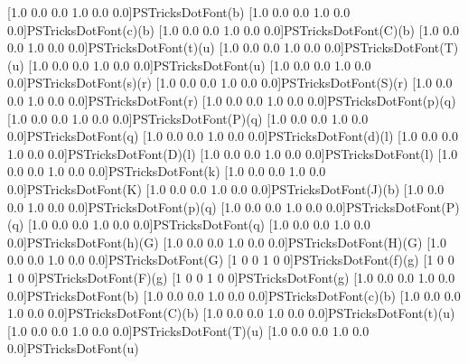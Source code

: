 \newpsfontdot{*}[1.0 0.0 0.0 1.0 0.0 0.0]{PSTricksDotFont}{(b)}
[1.0 0.0 0.0 1.0 0.0 0.0]{PSTricksDotFont}{(c)}{(b)}
[1.0 0.0 0.0 1.0 0.0 0.0]{PSTricksDotFont}{(C)}{(b)}
[1.0 0.0 0.0 1.0 0.0 0.0]{PSTricksDotFont}{(t)}{(u)}
[1.0 0.0 0.0 1.0 0.0 0.0]{PSTricksDotFont}{(T)}{(u)}
[1.0 0.0 0.0 1.0 0.0 0.0]{PSTricksDotFont}{(u)}
[1.0 0.0 0.0 1.0 0.0 0.0]{PSTricksDotFont}{(s)}{(r)}
[1.0 0.0 0.0 1.0 0.0 0.0]{PSTricksDotFont}{(S)}{(r)}
[1.0 0.0 0.0 1.0 0.0 0.0]{PSTricksDotFont}{(r)}
[1.0 0.0 0.0 1.0 0.0 0.0]{PSTricksDotFont}{(p)}{(q)}
[1.0 0.0 0.0 1.0 0.0 0.0]{PSTricksDotFont}{(P)}{(q)}
[1.0 0.0 0.0 1.0 0.0 0.0]{PSTricksDotFont}{(q)}
[1.0 0.0 0.0 1.0 0.0 0.0]{PSTricksDotFont}{(d)}{(l)}
[1.0 0.0 0.0 1.0 0.0 0.0]{PSTricksDotFont}{(D)}{(l)}
[1.0 0.0 0.0 1.0 0.0 0.0]{PSTricksDotFont}{(l)}
[1.0 0.0 0.0 1.0 0.0 0.0]{PSTricksDotFont}{(k)}
[1.0 0.0 0.0 1.0 0.0 0.0]{PSTricksDotFont}{(K)}
[1.0 0.0 0.0 1.0 0.0 0.0]{PSTricksDotFont}{(J)}{(b)}
%
[1.0 0.0 0.0 1.0 0.0 0.0]{PSTricksDotFont}{(p)}{(q)}
[1.0 0.0 0.0 1.0 0.0 0.0]{PSTricksDotFont}{(P)}{(q)}
[1.0 0.0 0.0 1.0 0.0 0.0]{PSTricksDotFont}{(q)}
[1.0 0.0 0.0 1.0 0.0 0.0]{PSTricksDotFont}{(h)}{(G)}
[1.0 0.0 0.0 1.0 0.0 0.0]{PSTricksDotFont}{(H)}{(G)}
[1.0 0.0 0.0 1.0 0.0 0.0]{PSTricksDotFont}{(G)}
[1 0 0 1 0 0]{PSTricksDotFont}{(f)}{(g)}
[1 0 0 1 0 0]{PSTricksDotFont}{(F)}{(g)}
[1 0 0 1 0 0]{PSTricksDotFont}{(g)}
%
[1.0 0.0 0.0 1.0 0.0 0.0]{PSTricksDotFont}{(b)}
[1.0 0.0 0.0 1.0 0.0 0.0]{PSTricksDotFont}{(c)}{(b)}
[1.0 0.0 0.0 1.0 0.0 0.0]{PSTricksDotFont}{(C)}{(b)}
[1.0 0.0 0.0 1.0 0.0 0.0]{PSTricksDotFont}{(t)}{(u)}
[1.0 0.0 0.0 1.0 0.0 0.0]{PSTricksDotFont}{(T)}{(u)}
[1.0 0.0 0.0 1.0 0.0 0.0]{PSTricksDotFont}{(u)}
